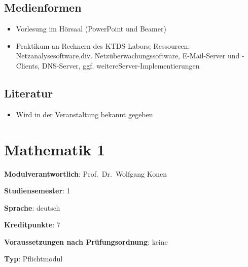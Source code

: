 \section*{Medienformen\label{/mi-2017/modulbeschreibungen-bachelor/BA_KommunikationstechnikundNetze}}\label{medienformenpathlabelmi-2017modulbeschreibungen-bachelorbaux5fkommunikationstechnikundnetze}

\begin{itemize}
\tightlist
\item
  Vorlesung im Hörsaal (PowerPoint und Beamer)
\item
  Praktikum an Rechnern des KTDS-Labors; Ressourcen:
  Netzanalysesoftware,div. Netzüberwachungssoftware, E-Mail-Server und
  -Clients, DNS-Server, ggf. weitereServer-Implementierungen
\end{itemize}

\section*{Literatur\label{/mi-2017/modulbeschreibungen-bachelor/BA_KommunikationstechnikundNetze}}\label{literaturpathlabelmi-2017modulbeschreibungen-bachelorbaux5fkommunikationstechnikundnetze}

\begin{itemize}
\tightlist
\item
  Wird in der Veranstaltung bekannt gegeben
\end{itemize}

\chapter{Mathematik
1\label{/mi-2017/modulbeschreibungen-bachelor/BA_Mathematik1}}\label{mathematik-1pathlabelmi-2017modulbeschreibungen-bachelorbaux5fmathematik1}

\begin{modulHead}
\textbf{Modulverantwortlich}: Prof.~Dr.~Wolfgang
Konen
\end{modulHead}
\begin{modulHead}
\textbf{Studiensemester}:
1
\end{modulHead}
\begin{modulHead}
\textbf{Sprache}:
deutsch
\end{modulHead}
\begin{modulHead}
\textbf{Kreditpunkte}:
7
\end{modulHead}
\begin{modulHead}
\textbf{Voraussetzungen nach
Prüfungsordnung}: keine
\end{modulHead}
\begin{modulHead}
\textbf{Typ}:
Pflichtmodul
\end{modulHead}


